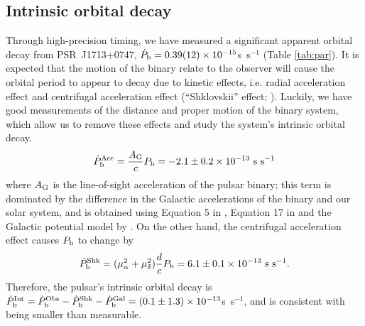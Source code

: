 \subsection{Intrinsic orbital decay}
\label{sec:obdecay}
Through high-precision timing, we have measured a significant apparent
orbital decay from PSR~J1713+0747, $\dot{P}_{\rm b} =
0.39(12)\times10^{-15}$s~s$^{-1}$ (Table \ref{tab:par}).
It is expected that the motion of the binary relate to the observer will
cause the orbital period to appear to decay due to kinetic effects, i.e. radial acceleration
effect \citep{dt91} and centrifugal acceleration effect (``Shklovskii'' effect;
\citealt{shk70}). Luckily, we have good measurements of the distance and proper
motion of the binary system, which allow us to remove these effects and study the system's intrinsic orbital decay.
\begin{equation}
\dot{P}_{\rm b}^{\rm Acc} = \frac{A_{\rm G}}{c} P_{\rm b} =
-2.1\pm0.2\times10^{-13}~{\rm s~s^{-1}}
\end{equation}
where $A_{\rm G}$ is the line-of-sight acceleration of the pulsar binary;
this term is dominated by the difference in the Galactic accelerations of the
binary and our solar system, and is obtained using
Equation 5 in \citet{nt95}, Equation 17 in \citet{lwj+09} and the Galactic
potential model by \citet{hf04a}.
On the other hand, the centrifugal acceleration effect causes $P_{\rm b}$ to
change by
\begin{equation}
\dot{P}_{\rm b}^{\rm Shk} = (\mu_{\alpha}^2+\mu_{\delta}^2)\frac{d}{c}P_{\rm
b} = 6.1\pm0.1\times10^{-13}~{\rm s~s^{-1}}.
\end{equation}
Therefore, the pulsar's intrinsic orbital decay is $\dot{P}_{\rm b}^{\rm Int}
= \dot{P}_{\rm b}^{\rm Obs} - \dot{P}_{\rm b}^{\rm Shk} - \dot{P}_{\rm b}^{\rm
Gal} = (0.1\pm1.3)\times10^{-13}$s~s$^{-1}$, and is consistent with being smaller than measurable.

